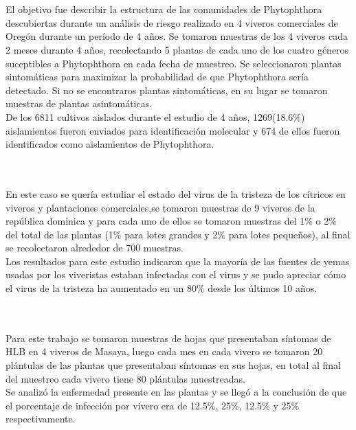 ~\\\textbf{\citet{AC3}}
~\\El objetivo fue describir la estructura de las comunidades de Phytophthora descubiertas durante un an\'{a}lisis de riesgo realizado en 4 viveros comerciales de Oreg\'{o}n durante un per\'{i}odo de 4 a\~{n}os. Se tomaron muestras de los 4 viveros cada 2 meses durante 4 a\~{n}os, recolectando 5 plantas de cada uno de los cuatro g\'{e}neros suceptibles a Phytophthora en cada fecha de muestreo. Se seleccionaron plantas sintom\'{a}ticas para maximizar la probabilidad de que Phytophthora ser\'{i}a detectado. Si no se encontraros plantas sintom\'{a}ticas, en su lugar se tomaron muestras de plantas asintom\'{a}ticas.
~\\De los 6811 cultivos aislados durante el estudio de 4 a\~{n}os, 1269(18.6\%) aislamientos fueron enviados para identificaci\'{o}n molecular y 674 de ellos fueron identificados como aislamientos de Phytophthora.

~\\\textbf{\citet{AC4}}
~\\En este caso se quer\'{i}a estudiar el estado del virus de la tristeza de los c\'{i}tricos en viveros y plantaciones comerciales,se tomaron muestras de 9 viveros de la rep\'{u}blica dominica y para cada uno de ellos se tomaron muestras del 1\% o 2\% del total de las plantas (1\% para lotes grandes y 2\% para lotes peque\~{n}os), al final se recolectaron alrededor de 700 muestras.
~\\Los resultados para este estudio indicaron que la mayor\'{i}a de las fuentes de yemas usadas por los viveristas estaban infectadas con el virus y se pudo apreciar c\'{o}mo el virus de la tristeza ha aumentado en un 80\% desde los \'{u}ltimos 10 a\~{n}os.


~\\\textbf{\citet{AC5}}
~\\Para este trabajo se tomaron muestras de hojas que presentaban s\'{i}ntomas de HLB en 4 viveros de Masaya, luego cada mes en cada vivero se tomaron 20 pl\'{a}ntulas de las plantas que presentaban s\'{i}ntomas en sus hojas, en total al final del muestreo cada vivero tiene 80 pl\'{a}ntulas muestreadas.
~\\Se analiz\'{o} la enfermedad presente en las plantas y se lleg\'{o} a la conclusi\'{o}n de que el porcentaje de infecci\'{o}n por vivero era de 12.5\%, 25\%, 12.5\% y 25\% respectivamente.

